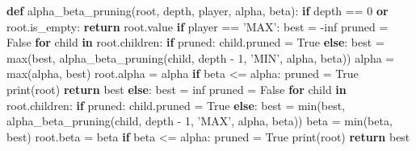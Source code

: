 \documentclass[11pt]{article}
\newenvironment{Shaded}{}{}
\newcommand{\KeywordTok}[1]{\textcolor[rgb]{0.00,0.44,0.13}{\textbf{{#1}}}}
\newcommand{\DecValTok}[1]{\textcolor[rgb]{0.25,0.63,0.44}{{#1}}}
\newcommand{\StringTok}[1]{\textcolor[rgb]{0.25,0.44,0.63}{{#1}}}
\newcommand{\NormalTok}[1]{{#1}}
\newcommand{\VariableTok}[1]{\textcolor[rgb]{0.10,0.09,0.49}{{#1}}}
\newcommand{\ControlFlowTok}[1]{\textcolor[rgb]{0.00,0.44,0.13}{\textbf{{#1}}}}
\newcommand{\OperatorTok}[1]{\textcolor[rgb]{0.40,0.40,0.40}{{#1}}}
\newcommand{\BuiltInTok}[1]{{#1}}
\begin{document}
\begin{Shaded}
\begin{Highlighting}[]
\KeywordTok{def} \NormalTok{alpha_beta_pruning(root, depth, player, alpha, beta):}
    \ControlFlowTok{if} \NormalTok{depth }\OperatorTok{==} \DecValTok{0} \KeywordTok{or} \NormalTok{root.is_empty:}
        \ControlFlowTok{return} \NormalTok{root.value}
    \ControlFlowTok{if} \NormalTok{player }\OperatorTok{==} \StringTok{'MAX'}\NormalTok{:}
        \NormalTok{best }\OperatorTok{=} \OperatorTok{-}\NormalTok{inf}
        \NormalTok{pruned }\OperatorTok{=} \VariableTok{False}
        \ControlFlowTok{for} \NormalTok{child }\KeywordTok{in} \NormalTok{root.children:}
            \ControlFlowTok{if} \NormalTok{pruned:}
                \NormalTok{child.pruned }\OperatorTok{=} \VariableTok{True}
            \ControlFlowTok{else}\NormalTok{:}
                \NormalTok{best }\OperatorTok{=} \BuiltInTok{max}\NormalTok{(best,}
                           \NormalTok{alpha_beta_pruning(child, depth }\OperatorTok{-} \DecValTok{1}\NormalTok{, }\StringTok{'MIN'}\NormalTok{,}
                                              \NormalTok{alpha, beta))}
                \NormalTok{alpha }\OperatorTok{=} \BuiltInTok{max}\NormalTok{(alpha, best)}
                \NormalTok{root.alpha }\OperatorTok{=} \NormalTok{alpha}
                \ControlFlowTok{if} \NormalTok{beta }\OperatorTok{<=} \NormalTok{alpha:}
                    \NormalTok{pruned }\OperatorTok{=} \VariableTok{True}
        \BuiltInTok{print}\NormalTok{(root)}
        \ControlFlowTok{return} \NormalTok{best}
    \ControlFlowTok{else}\NormalTok{:}
        \NormalTok{best }\OperatorTok{=} \NormalTok{inf}
        \NormalTok{pruned }\OperatorTok{=} \VariableTok{False}
        \ControlFlowTok{for} \NormalTok{child }\KeywordTok{in} \NormalTok{root.children:}
            \ControlFlowTok{if} \NormalTok{pruned:}
                \NormalTok{child.pruned }\OperatorTok{=} \VariableTok{True}
            \ControlFlowTok{else}\NormalTok{:}
                \NormalTok{best }\OperatorTok{=} \BuiltInTok{min}\NormalTok{(best,}
                           \NormalTok{alpha_beta_pruning(child, depth }\OperatorTok{-} \DecValTok{1}\NormalTok{, }\StringTok{'MAX'}\NormalTok{,}
                                              \NormalTok{alpha, beta))}
                \NormalTok{beta }\OperatorTok{=} \BuiltInTok{min}\NormalTok{(beta, best)}
                \NormalTok{root.beta }\OperatorTok{=} \NormalTok{beta}
                \ControlFlowTok{if} \NormalTok{beta }\OperatorTok{<=} \NormalTok{alpha:}
                    \NormalTok{pruned }\OperatorTok{=} \VariableTok{True}
        \BuiltInTok{print}\NormalTok{(root)}
        \ControlFlowTok{return} \NormalTok{best}
\end{Highlighting}
\end{Shaded}
\end{document}

